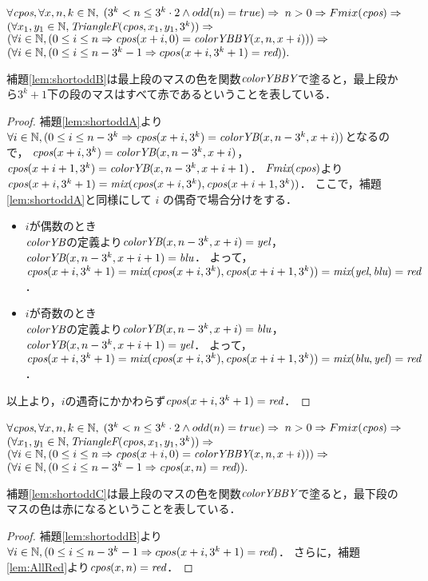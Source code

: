 \begin{lem}[\ShortOddB] \label{lem:shortoddB}
  $\forall \textit{cpos}, \forall x, n, k \in \mathbb{N},$
  $(3^k < n \leq 3^k \cdot 2 \land odd(n) = true) \Rightarrow$
  $n > 0  \Rightarrow Fmix(\textit{cpos}) \Rightarrow $
  $(\forall x_1, y_1 \in \mathbb{N}, \textit{TriangleF}(\textit{cpos},x_1,y_1,3^k)) \Rightarrow$
  $(\forall i \in \mathbb{N}, (0 \leq i \leq n \Rightarrow \textit{cpos}(x+i,0) = \textit{colorYBBY}(x,n,x+i))) \Rightarrow$
  $(\forall i \in \mathbb{N}, (0 \leq i \leq n - 3^k-1 \Rightarrow cpos(x+i,3^k+1)= \textit{red})).$
\end{lem}
補題\ref{lem:shortoddB}は最上段のマスの色を関数$\textit{colorYBBY}$で塗ると，最上段から$3^k+1$下の段のマスはすべて赤であるということを表している．
\begin{proof}
  補題\ref{lem:shortoddA}より$\forall i \in \mathbb{N}, (0 \leq i \leq n - 3^k \Rightarrow \textit{cpos}(x+i,3^k) = \textit{colorYB}(x,n-3^k,x+i))$となるので，
  $\textit{cpos}(x+i,3^k) = \textit{colorYB}(x,n-3^k,x+i)$，
  $\textit{cpos}(x+i+1,3^k) = \textit{colorYB}(x,n-3^k,x+i+1)$．
  $\textit{Fmix}(\textit{cpos})$より$\textit{cpos}(x+i,3^k+1) = \textit{mix}(\textit{cpos}(x+i,3^k),\textit{cpos}(x+i+1,3^k))$．
  ここで，補題\ref{lem:shortoddA}と同様にして $i$ の偶奇で場合分けをする．
  \begin{itemize}
  \item
    $i$が偶数のとき \\
    $\textit{colorYB}$の定義より$\textit{colorYB}(x,n-3^k,x+i)=\textit{yel}$，$\textit{colorYB}(x,n-3^k,x+i+1)=\textit{blu}$．
    よって，$\textit{cpos}(x+i,3^k+1)=\textit{mix}(\textit{cpos}(x+i,3^k),\textit{cpos}(x+i+1,3^k))=\textit{mix}(\textit{yel},\textit{blu})=\textit{red}$．
  \item
    $i$が奇数のとき \\
    $\textit{colorYB}$の定義より$\textit{colorYB}(x,n-3^k,x+i)=\textit{blu}$，$\textit{colorYB}(x,n-3^k,x+i+1)=\textit{yel}$．
    よって，$\textit{cpos}(x+i,3^k+1)=\textit{mix}(\textit{cpos}(x+i,3^k),\textit{cpos}(x+i+1,3^k))=\textit{mix}(\textit{blu},\textit{yel})=\textit{red}$．
  \end{itemize}
  以上より，$i$の遇奇にかかわらず$\textit{cpos}(x+i,3^k+1) = \textit{red}$．
\end{proof}

\begin{lem}[\ShortOddC] \label{lem:shortoddC}
  $\forall \textit{cpos}, \forall x, n, k \in \mathbb{N},$
  $(3^k < n \leq 3^k \cdot 2 \land odd(n) = true) \Rightarrow$
  $n > 0  \Rightarrow Fmix(\textit{cpos}) \Rightarrow $
  $(\forall x_1, y_1 \in \mathbb{N}, \textit{TriangleF}(\textit{cpos},x_1,y_1,3^k)) \Rightarrow$
  $(\forall i \in \mathbb{N}, (0 \leq i \leq n \Rightarrow \textit{cpos}(x+i,0) = \textit{colorYBBY}(x,n,x+i))) \Rightarrow$
  $(\forall i \in \mathbb{N}, (0 \leq i \leq n - 3^k-1 \Rightarrow \textit{cpos}(x,n)= \textit{red})).$
\end{lem}
補題\ref{lem:shortoddC}は最上段のマスの色を関数$\textit{colorYBBY}$で塗ると，最下段のマスの色は赤になるということを表している．
\begin{proof}
  補題\ref{lem:shortoddB}より$\forall i \in \mathbb{N}, (0 \leq i \leq n - 3^k-1 \Rightarrow cpos(x+i,3^k+1)= \textit{red})$．
  さらに，補題\ref{lem:AllRed}より$\textit{cpos}(x,n)=\textit{red}$．
\end{proof}

